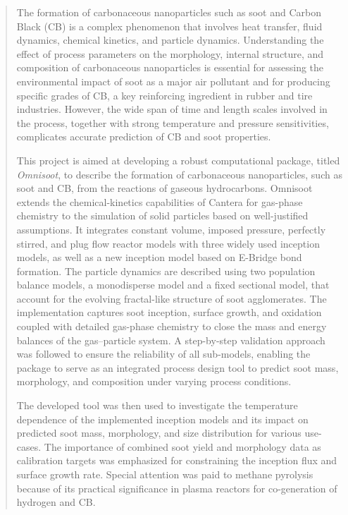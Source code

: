 \begin{abstract}

The formation of carbonaceous nanoparticles such as soot and Carbon Black (CB) is a complex phenomenon that involves heat transfer, fluid dynamics, chemical kinetics, and particle dynamics. Understanding the effect of process parameters on the morphology, internal structure, and composition of carbonaceous nanoparticles is essential for assessing the environmental impact of soot as a major air pollutant and for producing specific grades of CB, a key reinforcing ingredient in rubber and tire industries. However, the wide span of time and length scales involved in the process, together with strong temperature and pressure sensitivities, complicates accurate prediction of CB and soot properties.

This project is aimed at developing a robust computational package, titled \textit{Omnisoot}, to describe the formation of carbonaceous nanoparticles, such as soot and CB, from the reactions of gaseous hydrocarbons. Omnisoot extends the chemical-kinetics capabilities of Cantera for gas-phase chemistry to the simulation of solid particles based on well-justified assumptions. It integrates constant volume, imposed pressure, perfectly stirred, and plug flow reactor models with three widely used inception models, as well as a new inception model based on E-Bridge bond formation. The particle dynamics are described using two population balance models, a monodisperse model and a fixed sectional model, that account for the evolving fractal-like structure of soot agglomerates. The implementation captures soot inception, surface growth, and oxidation coupled with detailed gas-phase chemistry to close the mass and energy balances of the gas–particle system. A step-by-step validation approach was followed to ensure the reliability of all sub-models, enabling the package to serve as an integrated process design tool to predict soot mass, morphology, and composition under varying process conditions.

The developed tool was then used to investigate the temperature dependence of the implemented inception models and its impact on predicted soot mass, morphology, and size distribution for various use-cases. The importance of combined soot yield and morphology data as calibration targets was emphasized for constraining the inception flux and surface growth rate. Special attention was paid to methane pyrolysis because of its practical significance in plasma reactors for co-generation of hydrogen and CB.


\end{abstract}
